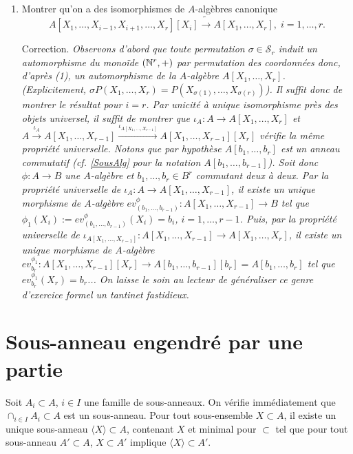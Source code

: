 \begin{enumerate}[leftmargin=* ,parsep=0cm,itemsep=0cm,topsep=0cm]
\item Montrer qu'on a des isomorphismes de $A$-algèbres canonique $$  A[X_1,\dots,X_{i-1},X_{i+1},\dots, X_r][X_i]\tilde{\rightarrow} A[X_1,\dots,X_r],\; i=1,\dots, r.$$

   Correction. \textit{Observons d'abord que toute permutation $\sigma\in \mathcal{S}_r$ induit un automorphisme du monoïde $(\mathbb{N}^r,+)$ par permutation des coordonnées donc, d'après (1), un automorphisme de la $A$-algèbre $A[X_1,\dots, X_r]$. (Explicitement, $\sigma P(X_1,\dots, X_r)=P(X_{\sigma(1)},\dots, X_{\sigma(r)})$). Il suffit donc de montrer le résultat pour $i=r$. Par unicité  à unique isomorphisme près des objets universel, il suffit de montrer que
$\iota_A:A\rightarrow A[X_1,\dots, X_r]$ et $A\stackrel{\iota_A}{\rightarrow} A[X_1,\dots, X_{r-1}]\stackrel{\iota_{A[X_1,\dots, X_{r-1}]}}{\rightarrow} A[X_1,\dots, X_{r-1}][X_r]$ vérifie la même propriété universelle. Notons que par hypothèse  $A[b_1,\dots ,b_r]$ est un anneau commutatif (\textit{cf.} \ref{SousAlg} pour la notation $A[b_1,\dots, b_{r-1}]$). Soit donc $\phi:A\rightarrow B$ une $A$-algèbre et $b_1,\dots, b_r\in B^r$ commutant deux à deux. Par la propriété universelle de $\iota_A:A\rightarrow A[X_1,\dots, X_{r-1}]$, il existe un unique morphisme de $A$-algèbre $ev_{(b_1,\dots, b_{r-1})}^\phi:A[X_1,\dots,X_{r-1}]\rightarrow B$ tel que $\phi_1(X_i):=ev_{(b_1,\dots, b_{r-1})}^\phi(X_i)=b_i$, $i=1,\dots, r-1$. Puis, par la propriété universelle de $\iota_{A[X_1,\dots, X_{r-1}]}:A[X_1,\dots, X_{r-1}]\rightarrow A[X_1,\dots, X_r]$, il existe un unique morphisme de $A$-algèbre $ev_{b_r}^{\phi_1}:A[X_1,\dots,X_{r-1}][X_r]\rightarrow A[b_1,\dots ,b_{r-1}][b_r]=A[b_1,\dots,b_r]$ tel que $ev_{b_r}^{\phi_1}(X_r)=b_r$... On laisse le soin au lecteur de généraliser ce genre d'exercice formel un tantinet fastidieux.} \\

  \end{enumerate}




  \section{Sous-anneau engendré par une partie} Soit  $A_i\subset A$, $i\in I$ une famille de sous-anneaux. On vérifie immédiatement que $\cap_{i\in I}A_i\subset A$ est un sous-anneau. Pour tout sous-ensemble $X\subset A$, il existe
un unique sous-anneau $\langle X\rangle \subset A$, contenant $X$ et minimal pour $\subset$ \ie{} tel que pour  tout sous-anneau $A'\subset A$,   $X\subset A'$ implique  $\langle X\rangle\subset A'$.

